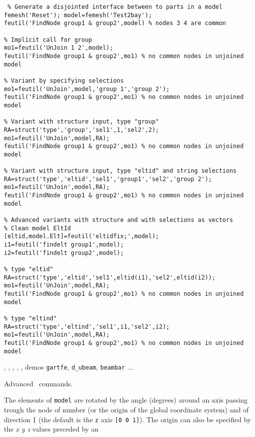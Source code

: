 \begin{verbatim}
 % Generate a disjointed interface between to parts in a model
femesh('Reset'); model=femesh('Test2bay');
feutil('FindNode group1 & group2',model) % nodes 3 4 are common

% Implicit call for group
mo1=feutil('UnJoin 1 2',model);
feutil('FindNode group1 & group2',mo1) % no common nodes in unjoined model
 
% Variant by specifying selections
mo1=feutil('UnJoin',model,'group 1','group 2');
feutil('FindNode group1 & group2',mo1) % no common nodes in unjoined model

% Variant with structure input, type "group"
RA=struct('type','group','sel1',1,'sel2',2);
mo1=feutil('UnJoin',model,RA);
feutil('FindNode group1 & group2',mo1) % no common nodes in unjoined model

% Variant with structure input, type "eltid" and string selections
RA=struct('type','eltid','sel1','group1','sel2','group 2');
mo1=feutil('UnJoin',model,RA);
feutil('FindNode group1 & group2',mo1) % no common nodes in unjoined model

% Advanced variants with structure and with selections as vectors
% Clean model EltId
[eltid,model.Elt]=feutil('eltidfix;',model);
i1=feutil('findelt group1',model);
i2=feutil('findelt group2',model);

% type "eltid"
RA=struct('type','eltid','sel1',eltid(i1),'sel2',eltid(i2));
mo1=feutil('UnJoin',model,RA);
feutil('FindNode group1 & group2',mo1) % no common nodes in unjoined model

% type "eltind"
RA=struct('type','eltind','sel1',i1,'sel2',i2);
mo1=feutil('UnJoin',model,RA);
feutil('FindNode group1 & group2',mo1) % no common nodes in unjoined model
\end{verbatim}%



\noindent {}, \femk, \fecom, \feplot, , demos {\tt gartfe},  {\tt d\_ubeam}, {\tt beambar} ... 

Advanced \feutil\ commands.


 The elements of {\tt model} are rotated by the angle  (degrees) around an axis passing trough the node of number  (or the origin of the global coordinate system) and of direction {\tt [}\tsi{nx ny nz}{\tt ]} (the default is the {\tt z} axis {\tt [0 0 1]}). The origin can also be specified by the {\sl x y z} values preceded by an 

